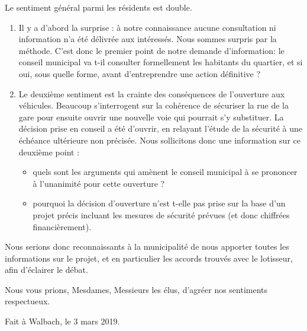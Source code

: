 \documentclass[a4paper,12pt]{article}
\begin{document}
Le sentiment général parmi les résidents est double.
\begin{enumerate}
	  \item
Il y a d'abord la surprise : à notre connaissance aucune consultation ni information n'a été délivrée aux 
intéressés. Nous sommes surpris par la méthode. C'est donc le premier point de notre demande d'information:
le conseil municipal va t-il consulter formellement les habitants du quartier, et si oui, sous quelle forme, avant 
d'entreprendre une action définitive ?
	  \item
Le deuxième sentiment est la crainte des conséquences de l'ouverture aux véhicules. Beaucoup s'interrogent
sur la cohérence de sécuriser la rue de la gare pour ensuite ouvrir une nouvelle voie qui pourrait s'y substituer.
La décision prise en conseil a été d'ouvrir, en relayant l'étude de la sécurité à une échéance ultérieure non précisée.
Nous sollicitons donc une information sur ce deuxième point : 
\begin{itemize}
	  \item quels sont les arguments qui amènent  le conseil
		municipal à se prononcer à l'unanimité pour cette ouverture ?
	\item pourquoi la décision d'ouverture n'est t-elle pas prise sur la base d'un projet précis incluant les 
		mesures de sécurité prévues (et donc chiffrées financièrement).
\end{itemize}
\end{enumerate}

Nous serions donc reconnaissants à la municipalité de nous apporter toutes les informations sur le projet, et en 
particulier les accords trouvés avec le lotisseur, afin d'éclairer le débat.

Nous vous prions, Mesdames, Messieurs les élus, d'agréer nos sentiments respectueux.


\begin{flushright}
{\small Fait à Walbach, le 3 mars 2019}.\\
\end{flushright}
\end{document}
